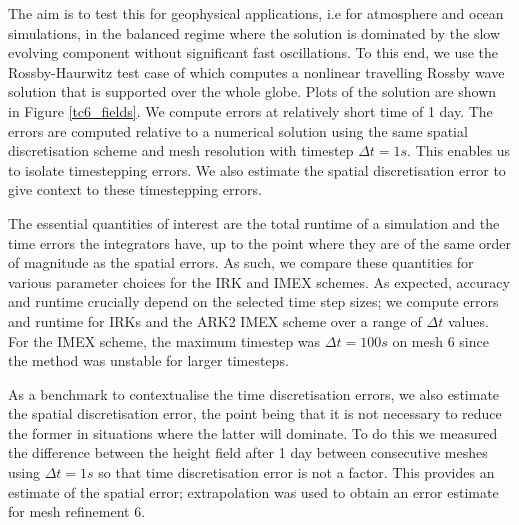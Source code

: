 \documentclass[a4paper, 12pt]{article}
\begin{document}
The aim is to test this for geophysical applications, i.e for
atmosphere and ocean simulations, in the balanced regime where the
solution is dominated by the slow evolving component without
significant fast oscillations. To this end, we use the Rossby-Haurwitz
test case of \cite[Section 6]{WILLIAMSON1992211} which computes a
nonlinear travelling Rossby wave solution that is supported over the
whole globe. Plots of the solution are shown in Figure
\ref{tc6_fields}. We compute errors at relatively short time of 1 day.
The errors are computed relative to a numerical solution using the
same spatial discretisation scheme and mesh resolution with timestep
$\Delta t = 1s$. This enables us to isolate timestepping errors. We
also estimate the spatial discretisation error to give context to
these timestepping errors.

The essential quantities of interest are the total runtime of a
simulation and the time errors the integrators have, up to the point
where they are of the same order of magnitude as the spatial
errors. As such, we compare these quantities for various parameter
choices for the IRK and IMEX schemes. As expected, accuracy and
runtime crucially depend on the selected time step sizes; we compute
errors and runtime for IRKs and the ARK2 IMEX scheme over a range
of $\Delta t$ values. For the IMEX scheme, the maximum timestep
was $\Delta t=100s$ on mesh 6 since the method was unstable for larger
timesteps.

As a benchmark to contextualise the time discretisation errors, we
also estimate the spatial discretisation error, the point being that
it is not necessary to reduce the former in situations where the
latter will dominate. To do this we measured the difference between
the height field after 1 day between consecutive meshes using $\Delta
t =1s$ so that time discretisation error is not a factor. This
provides an estimate of the spatial error; extrapolation was used to
obtain an error estimate for mesh refinement 6.
\end{document}
